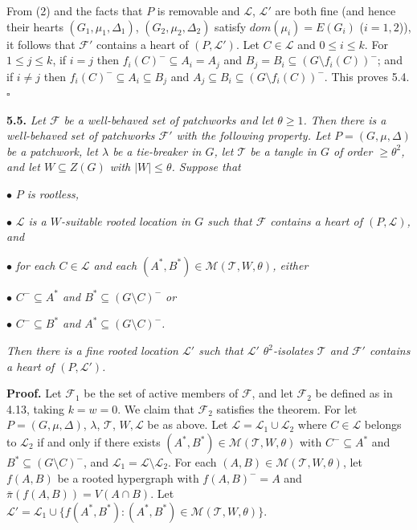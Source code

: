 From (2) and the facts that $P$ is removable and $\mathcal{L}$, $\mathcal{L}'$ are both fine (and hence their hearts $(G_1, \mu_1, \Delta_1)$, $(G_2, \mu_2, \Delta_2)$ satisfy $dom(\mu_i) = E(G_i)$ ($i = 1, 2$)), it follows that $\mathcal{F}'$ contains a heart of $(P, \mathcal{L}')$. Let $C \in \mathcal{L}$ and $0 \le i \le k$. For $1 \le j \le k$, if $i = j$ then $f_i(C)^- \subseteq A_i = A_j$ and $B_j = B_i \subseteq (G \setminus f_i(C))^-$; and if $i \ne j$ then $f_i(C)^- \subseteq A_i \subseteq B_j$ and $A_j \subseteq B_i \subseteq (G \setminus f_i(C))^-$. This proves 5.4. $\square$

\textbf{5.5.} \textit{Let $\mathcal{F}$ be a well-behaved set of patchworks and let $\theta \ge 1$. Then there is a well-behaved set of patchworks $\mathcal{F}'$ with the following property. Let $P = (G, \mu, \Delta)$ be a patchwork, let $\lambda$ be a tie-breaker in $G$, let $\mathcal{T}$ be a tangle in $G$ of order $\ge \theta^2$, and let $W \subseteq Z(G)$ with $|W| \le \theta$. Suppose that}

\hspace*{12pt}$\bullet$ \textit{$P$ is rootless,}

\hspace*{12pt}$\bullet$ \textit{$\mathcal{L}$ is a $W$-suitable rooted location in $G$ such that $\mathcal{F}$ contains a heart of $(P, \mathcal{L})$, and}

\hspace*{12pt}$\bullet$ \textit{for each $C \in \mathcal{L}$ and each $(A^*, B^*) \in \mathcal{M}(\mathcal{T}, W, \theta)$, either}

\hspace*{12pt}$\bullet$ \textit{$C^- \subseteq A^*$ and $B^* \subseteq (G \setminus C)^-$ or}

\hspace*{12pt}$\bullet$ \textit{$C^- \subseteq B^*$ and $A^* \subseteq (G \setminus C)^-$.}

\textit{Then there is a fine rooted location $\mathcal{L}'$ such that $\mathcal{L}'$ $\theta^2$-isolates $\mathcal{T}$ and $\mathcal{F}'$ contains a heart of $(P, \mathcal{L}')$.}

\textbf{Proof.} Let $\mathcal{F}_1$ be the set of active members of $\mathcal{F}$, and let $\mathcal{F}_2$ be defined as in 4.13, taking $k = w = 0$. We claim that $\mathcal{F}_2$ satisfies the theorem. For let $P = (G, \mu, \Delta)$, $\lambda$, $\mathcal{T}$, $W, \mathcal{L}$ be as above. Let $\mathcal{L} = \mathcal{L}_1 \cup \mathcal{L}_2$ where $C \in \mathcal{L}$ belongs to $\mathcal{L}_2$ if and only if there exists $(A^*, B^*) \in \mathcal{M}(\mathcal{T}, W, \theta)$ with $C^- \subseteq A^*$ and $B^* \subseteq (G \setminus C)^-$, and $\mathcal{L}_1 = \mathcal{L} \setminus \mathcal{L}_2$. For each $(A, B) \in \mathcal{M}(\mathcal{T}, W, \theta)$, let $f(A, B)$ be a rooted hypergraph with $f(A, B)^- = A$ and $\bar{\pi}(f(A, B)) = V(A \cap B)$. Let $\mathcal{L}' = \mathcal{L}_1 \cup \{f(A^*, B^*) : (A^*, B^*) \in \mathcal{M}(\mathcal{T}, W, \theta)\}$.
